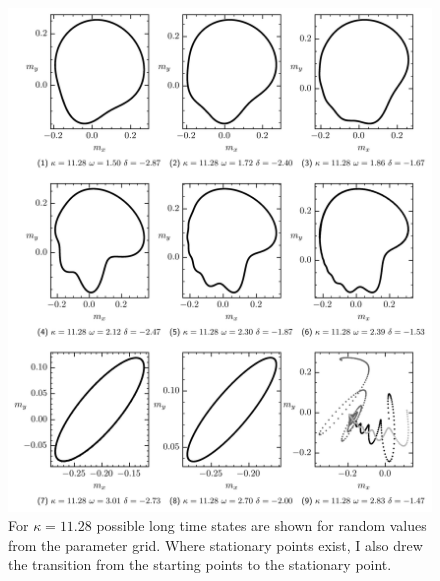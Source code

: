     \begin{figure}[H]
        \hspace*{-1cm}
        \includegraphics{pictures/lc_traj_kcut2.png}
        \caption{For $\kappa=11.28$ possible long time states are shown for random values from the parameter grid. Where stationary points exist, I also drew the transition from the starting points to the stationary point.}
    \end{figure}
    
